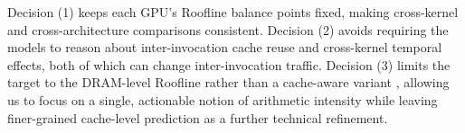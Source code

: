 Decision (1) keeps each GPU's Roofline balance points fixed, making cross-kernel and cross-architecture comparisons consistent.
Decision (2) avoids requiring the models to reason about inter-invocation cache reuse and cross-kernel temporal effects, both of which can change inter-invocation traffic.
Decision (3) limits the target to the DRAM-level Roofline rather than a cache-aware variant \cite{ilicCacheawareRooflineModel2014}, allowing us to focus on a single, actionable notion of arithmetic intensity while leaving finer-grained cache-level prediction as a further technical refinement.


\begin{table}[b!]
\centering
\caption{Sampled LLMs sorted by release date with corresponding input/output token costs (as-of March 2026)}
\label{tab:llm_comparison}
\scriptsize
\setlength{\tabcolsep}{3pt}
\renewcommand{\arraystretch}{1.05}
\end{table}
